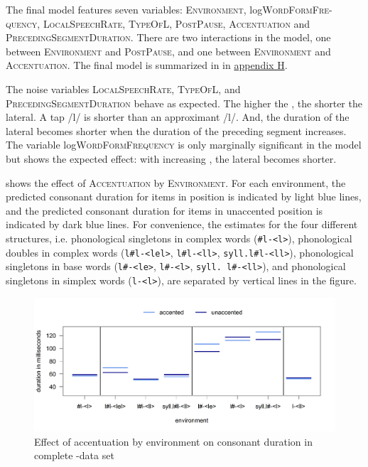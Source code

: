 The final model features seven variables: \textsc{Environment}, log\textsc{WordFormFre-quency},  \textsc{LocalSpeechRate}, \textsc{TypeOfL}, \textsc{PostPause}, \textsc{Accentuation} and \textsc{PrecedingSegmentDuration}. 
There are two interactions in the model, one between \textsc{Environment} and \textsc{PostPause}, and one between \textsc{Environment} and \textsc{Accentuation}. The final model is summarized in  in \hyperref[Appendix H: Model Summaries Experiment]{appendix H}.


The noise variables \textsc{LocalSpeechRate}, \textsc{TypeOfL}, and \textsc{PrecedingSegmentDuration} behave as expected. The higher the , the shorter the lateral. A tap /l/ is shorter than an approximant /l/. And, the duration of the lateral becomes shorter when the duration of the preceding segment increases.
The variable log\textsc{WordFormFrequency} is only marginally significant in the model but shows the expected effect: with increasing , the lateral becomes shorter. 


 shows the effect of \textsc{Accentuation} by \textsc{Environment}. For each environment, the predicted consonant duration for items in  position is indicated by light blue lines, and the predicted consonant duration for  items in unaccented position is indicated by dark blue lines.
 For convenience, the estimates for the four different structures, i.e. phonological singletons in complex words (\texttt{\#l-<l>}), phonological doubles in complex words  (\texttt{l\#l-<lel>}, \texttt{l\#l-<ll>}, \texttt{syll.l\#l-<ll>}), phonological singletons in base words (\texttt{l\#-<le>}, \texttt{l\#-<l>}, \texttt{syll. l\#-<ll>}), and phonological singletons in simplex words (\texttt{l-<l>}), are separated by vertical lines in the figure. 


\begin{figure}
	

	\includegraphics [scale=0.48] {images/Experiment/LyModelCompleteInterEnvAccLines}

	\caption{Effect of accentuation by environment on consonant duration in complete -data set}
	\label{fig:Env Acc ly Complete experiment}

\end{figure}




